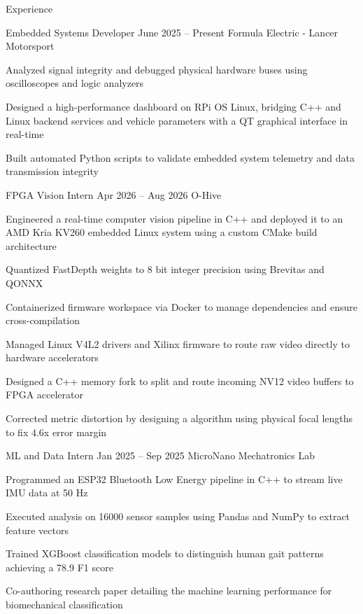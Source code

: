 \documentclass{template} %
\begin{document}
\begin{rSection}{Experience}

\begin{rWorkSection} {Embedded Systems Developer}
                      {June 2025 -- Present}
                      {Formula Electric - Lancer Motorsport}
                      {}
  {
    \item Analyzed signal integrity and debugged physical hardware buses using oscilloscopes and logic analyzers
    \item Designed a high-performance dashboard on RPi OS Linux, bridging C++ and Linux backend services and vehicle parameters with a QT graphical interface in real-time
    \item Built automated Python scripts to validate embedded system telemetry and data transmission integrity
  } 
  \end{rWorkSection}
  
  \begin{rWorkSection}{FPGA Vision Intern}
                      {Apr 2026 -- Aug 2026}
                      {O-Hive}
                      {}
  {
    \item Engineered a real-time computer vision pipeline in C++ and deployed it to an AMD Kria KV260 embedded Linux system using a custom CMake build architecture
    \item Quantized FastDepth weights to 8 bit integer precision using Brevitas and QONNX
    \item Containerized firmware workspace via Docker to manage dependencies and ensure cross-compilation
    \item Managed Linux V4L2 drivers and Xilinx firmware to route raw video directly to hardware accelerators
    \item Designed a C++ memory fork to split and route incoming NV12 video buffers to FPGA accelerator
    \item Corrected metric distortion by designing a algorithm using physical focal lengths to fix 4.6x error margin

}
  \end{rWorkSection}

  \begin{rWorkSection}{ML and Data Intern}
                      {Jan 2025 -- Sep 2025}
                      {MicroNano Mechatronics Lab}
                      {}
  {
    \item Programmed an ESP32 Bluetooth Low Energy pipeline in C++ to stream live IMU data at 50 Hz
    \item Executed analysis on 16000 sensor samples using Pandas and NumPy to extract feature vectors
    \item Trained XGBoost classification models to distinguish human gait patterns achieving a 78.9 F1 score
    \item Co-authoring research paper detailing the machine learning performance for biomechanical classification
  } \end{rWorkSection}


\end{rSection}
\end{document}
